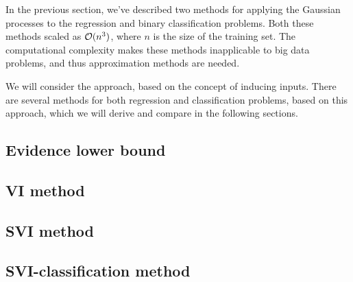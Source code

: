 \label{inducing_input_methods}
In the previous section, we've described two methods for applying the Gaussian processes to the regression and binary classification problems. Both these methods scaled as $\mathcal{O}(n^3)$, where $n$ is the size of the training set. The computational complexity makes these methods inapplicable to big data problems, and thus approximation methods are needed.

We will consider the approach, based on the concept of inducing inputs. There are several methods for both regression and classification problems, based on this approach, which we will derive and compare in the following sections.

\subsection{Evidence lower bound}
	
\subsection{VI method}
	
\subsection{SVI method}
	
\subsection{SVI-classification method}
	